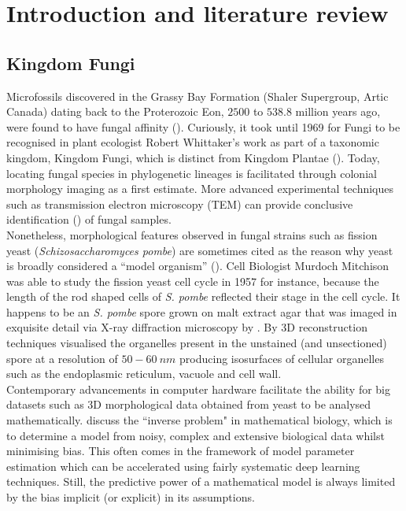 \chapter{Introduction and literature review}

\section{Kingdom Fungi}

Microfossils discovered in the Grassy Bay Formation 
(Shaler Supergroup, Artic Canada) dating back to the Proterozoic Eon, $2500$ to $538.8$ million years ago, were 
found to have fungal affinity (\cite{loron2019early}). Curiously, it took until 1969 for Fungi to be 
recognised in plant ecologist Robert Whittaker's work as part of a taxonomic kingdom, Kingdom Fungi,
which is distinct from Kingdom Plantae (\cite{whittaker1969new}). Today, locating fungal species 
in phylogenetic lineages is facilitated through colonial morphology imaging as a first 
estimate. More advanced experimental techniques such as transmission 
electron microscopy (TEM) can provide  
conclusive identification (\cite{loron2019early}) of fungal samples.
\\

Nonetheless, morphological features observed in fungal strains such as fission yeast 
(\textit{Schizosaccharomyces pombe}) are sometimes cited as the reason 
why yeast is broadly considered a ``model organism'' (\cite{hayles2018introduction}).
Cell Biologist Murdoch Mitchison was able to study the fission yeast cell cycle in 1957 for instance,
because the length of the rod shaped cells of \textit{S. pombe} reflected their stage in the cell cycle.
It happens to be an \textit{S. pombe} spore grown on malt extract agar that was imaged in exquisite detail via 
X-ray diffraction microscopy by \cite{jiang2010quantitative}. By 3D 
reconstruction techniques \cite{jiang2010quantitative} visualised the organelles
present in the unstained (and unsectioned) spore at a resolution of $50-60 \ nm$ 
producing isosurfaces of cellular organelles such as the endoplasmic reticulum, 
vacuole and cell wall.
\\

Contemporary advancements in computer hardware facilitate 
the ability for big datasets such as 3D morphological data 
obtained from yeast to be analysed mathematically. \cite{clermont2015inverse} 
discuss the ``inverse problem" in mathematical biology, which is to determine a model 
from noisy, complex and extensive biological data whilst minimising bias. This often 
comes in the framework of model parameter estimation which 
can be accelerated using fairly systematic deep learning techniques. Still, the predictive power
of a mathematical model is always limited by the bias implicit (or explicit) in its assumptions.
\\

